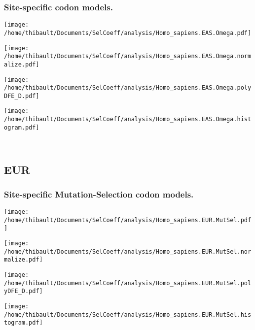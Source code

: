 \subsubsection*{Site-specific codon models.} 
\begin{minipage}{0.49\linewidth} 
\texttt{[image: /home/thibault/Documents/SelCoeff/analysis/Homo\_sapiens.EAS.Omega.pdf]} 
\end{minipage}
\begin{minipage}{0.49\linewidth} 
\texttt{[image: /home/thibault/Documents/SelCoeff/analysis/Homo\_sapiens.EAS.Omega.normalize.pdf]} 
\end{minipage}
\begin{minipage}{0.49\linewidth} 
\texttt{[image: /home/thibault/Documents/SelCoeff/analysis/Homo\_sapiens.EAS.Omega.polyDFE\_D.pdf]} 
\end{minipage}
\begin{minipage}{0.49\linewidth} 
\texttt{[image: /home/thibault/Documents/SelCoeff/analysis/Homo\_sapiens.EAS.Omega.histogram.pdf]} 
\end{minipage}
\\ 
\subsection{EUR} 
 
\subsubsection*{Site-specific Mutation-Selection codon models.} 
\begin{minipage}{0.49\linewidth} 
\texttt{[image: /home/thibault/Documents/SelCoeff/analysis/Homo\_sapiens.EUR.MutSel.pdf]} 
\end{minipage}
\begin{minipage}{0.49\linewidth} 
\texttt{[image: /home/thibault/Documents/SelCoeff/analysis/Homo\_sapiens.EUR.MutSel.normalize.pdf]} 
\end{minipage}
\begin{minipage}{0.49\linewidth} 
\texttt{[image: /home/thibault/Documents/SelCoeff/analysis/Homo\_sapiens.EUR.MutSel.polyDFE\_D.pdf]} 
\end{minipage}
\begin{minipage}{0.49\linewidth} 
\texttt{[image: /home/thibault/Documents/SelCoeff/analysis/Homo\_sapiens.EUR.MutSel.histogram.pdf]} 
\end{minipage}
\\ 
